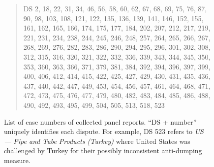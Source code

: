 \begin{figure}[h]
    \begin{quote}
        DS 2, 
        18, 
        22, 
        31, 
        34, 
        46, 
        56, 
        58, 
        60, 
        62, 
        67, 
        68, 
        69, 
        75, 
        76, 
        87, 
        90, 
        98, 
        103, 
        108, 
        121, 
        122, 
        135, 
        136, 
        139, 
        141, 
        146, 
        152, 
        155, 
        161, 
        162, 
        165, 
        166, 
        174, 
        175, 
        177, 
        184, 
        202, 
        207, 
        212, 
        217, 
        219, 
        221, 
        231, 
        234, 
        238, 
        244, 
        245, 
        246, 
        248, 
        257, 
        264, 
        265, 
        266, 
        267, 
        268, 
        269, 
        276, 
        282, 
        283, 
        286, 
        290, 
        294, 
        295, 
        296, 
        301, 
        302, 
        308, 
        312, 
        315, 
        316, 
        320, 
        321, 
        322, 
        332, 
        336, 
        339, 
        343, 
        344, 
        345, 
        350, 
        353, 
        360, 
        363, 
        366, 
        371, 
        379, 
        381, 
        384, 
        392, 
        394, 
        396, 
        397, 
        399, 
        400, 
        406, 
        412, 
        414, 
        415, 
        422, 
        425, 
        427, 
        429, 
        430, 
        431, 
        435, 
        436, 
        437, 
        440, 
        442, 
        447, 
        449, 
        453, 
        454, 
        456, 
        457, 
        461, 
        464, 
        468, 
        471, 
        472, 
        473, 
        475, 
        476, 
        477, 
        479, 
        480, 
        482, 
        483, 
        484, 
        485, 
        486, 
        488, 
        490, 
        492, 
        493, 
        495, 
        499, 
        504, 
        505, 
        513, 
        518, 
        523
    \end{quote}
    \caption{
        List of case numbers of collected panel reports. ``DS + number'' uniquely identifies each dispute. For example, DS 523 refers to \textit{US — Pipe and Tube Products (Turkey)} where United States was challenged by Turkey for their possibly inconsistent anti-dumping measure.
    }
    \label{fig:ds-cases-used}
\end{figure}

